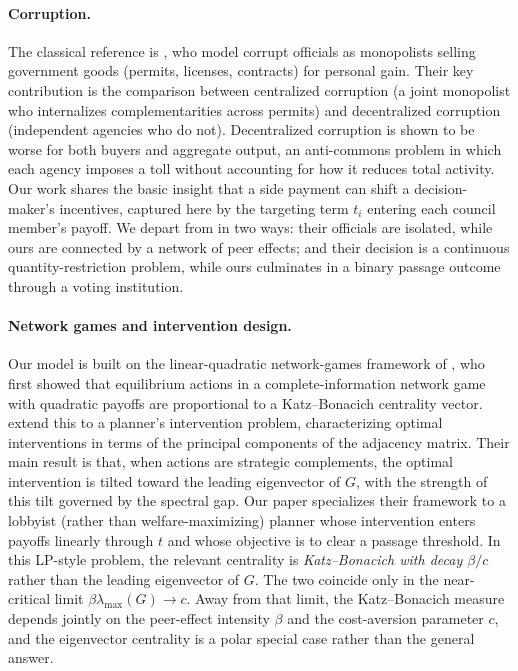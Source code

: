 \documentclass[11pt,letterpaper]{article}
\theoremstyle{plain}
\theoremstyle{definition}
\theoremstyle{remark}
\begin{document}
\paragraph{Corruption.} The classical reference is \citet{shleifer1993}, who model corrupt officials as monopolists selling government goods (permits, licenses, contracts) for personal gain. Their key contribution is the comparison between centralized corruption (a joint monopolist who internalizes complementarities across permits) and decentralized corruption (independent agencies who do not). Decentralized corruption is shown to be worse for both buyers and aggregate output, an anti-commons problem in which each agency imposes a toll without accounting for how it reduces total activity. Our work shares the basic insight that a side payment can shift a decision-maker's incentives, captured here by the targeting term $t_i$ entering each council member's payoff. We depart from \citet{shleifer1993} in two ways: their officials are isolated, while ours are connected by a network of peer effects; and their decision is a continuous quantity-restriction problem, while ours culminates in a binary passage outcome through a voting institution.

\paragraph{Network games and intervention design.} Our model is built on the linear-quadratic network-games framework of \citet{bcz2006}, who first showed that equilibrium actions in a complete-information network game with quadratic payoffs are proportional to a Katz--Bonacich centrality vector. \citet{ggg2020} extend this to a planner's intervention problem, characterizing optimal interventions in terms of the principal components of the adjacency matrix. Their main result is that, when actions are strategic complements, the optimal intervention is tilted toward the leading eigenvector of $G$, with the strength of this tilt governed by the spectral gap. Our paper specializes their framework to a lobbyist (rather than welfare-maximizing) planner whose intervention enters payoffs linearly through $t$ and whose objective is to clear a passage threshold. In this LP-style problem, the relevant centrality is \emph{Katz--Bonacich with decay $\beta/c$} rather than the leading eigenvector of $G$. The two coincide only in the near-critical limit $\beta \lambda_{\max}(G) \to c$. Away from that limit, the Katz--Bonacich measure depends jointly on the peer-effect intensity $\beta$ and the cost-aversion parameter $c$, and the eigenvector centrality is a polar special case rather than the general answer.
\end{document}
